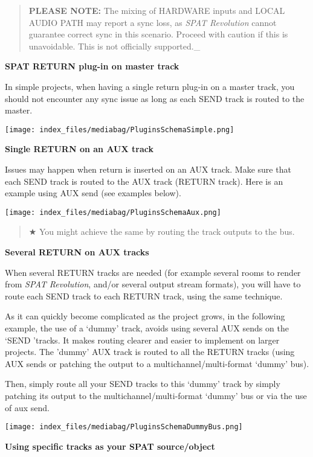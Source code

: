 \documentclass[
  letterpaper,
  DIV=11,
  numbers=noendperiod]{scrreport}
\begin{document}
\begin{quote}
\textbf{PLEASE NOTE:} The mixing of HARDWARE inputs and LOCAL AUDIO PATH
may report a sync loss, as \emph{SPAT Revolution} cannot guarantee
correct sync in this scenario. Proceed with caution if this is
unavoidable. This is not officially supported.\_
\end{quote}

\textbf{SPAT RETURN plug-in on master track}

In simple projects, when having a single return plug-in on a master
track, you should not encounter any sync issue as long as each SEND
track is routed to the master.

\texttt{[image: index\_files/mediabag/PluginsSchemaSimple.png]}

\textbf{Single RETURN on an AUX track}

Issues may happen when return is inserted on an AUX track. Make sure
that each SEND track is routed to the AUX track (RETURN track). Here is
an example using AUX send (see examples below).

\texttt{[image: index\_files/mediabag/PluginsSchemaAux.png]}

\begin{quote}
★ You might achieve the same by routing the track outputs to the bus.
\end{quote}

\textbf{Several RETURN on AUX tracks}

When several RETURN tracks are needed (for example several rooms to
render from \emph{SPAT Revolution}, and/or several output stream
formats), you will have to route each SEND track to each RETURN track,
using the same technique.

As it can quickly become complicated as the project grows, in the
following example, the use of a `dummy' track, avoids using several AUX
sends on the `SEND 'tracks. It makes routing clearer and easier to
implement on larger projects. The 'dummy' AUX track is routed to all the
RETURN tracks (using AUX sends or patching the output to a
multichannel/multi-format `dummy' bus).

Then, simply route all your SEND tracks to this `dummy' track by simply
patching its output to the multichannel/multi-format `dummy' bus or via
the use of aux send.

\texttt{[image: index\_files/mediabag/PluginsSchemaDummyBus.png]}

\textbf{Using specific tracks as your SPAT source/object}
\end{document}
